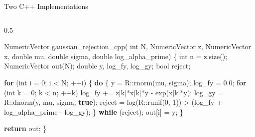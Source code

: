 \documentclass[
  ignorenonframetext,
]{beamer}
\newenvironment{Shaded}{\begin{snugshade}}{\end{snugshade}}
\newcommand{\ControlFlowTok}[1]{\textcolor[rgb]{0.00,0.23,0.31}{\textbf{#1}}}
\newcommand{\DataTypeTok}[1]{\textcolor[rgb]{0.68,0.00,0.00}{#1}}
\newcommand{\DecValTok}[1]{\textcolor[rgb]{0.68,0.00,0.00}{#1}}
\newcommand{\FloatTok}[1]{\textcolor[rgb]{0.68,0.00,0.00}{#1}}
\newcommand{\KeywordTok}[1]{\textcolor[rgb]{0.00,0.23,0.31}{\textbf{#1}}}
\newcommand{\NormalTok}[1]{\textcolor[rgb]{0.00,0.23,0.31}{#1}}
\newcommand{\OperatorTok}[1]{\textcolor[rgb]{0.37,0.37,0.37}{#1}}
\begin{document}
\begin{frame}[fragile]{Two C++ Implementations}
\begin{columns}[T]
\begin{column}{0.5\linewidth}
\begin{Shaded}
\begin{Highlighting}[]
\NormalTok{NumericVector gaussian\_rejection\_cpp}\OperatorTok{(}
    \DataTypeTok{int}\NormalTok{ N}\OperatorTok{,}\NormalTok{ NumericVector z}\OperatorTok{,}
\NormalTok{    NumericVector x}\OperatorTok{,} \DataTypeTok{double}\NormalTok{ mu}\OperatorTok{,}
    \DataTypeTok{double}\NormalTok{ sigma}\OperatorTok{,} \DataTypeTok{double}\NormalTok{ log\_alpha\_prime}\OperatorTok{)} \OperatorTok{\{}
  \DataTypeTok{int}\NormalTok{ n }\OperatorTok{=}\NormalTok{ z}\OperatorTok{.}\NormalTok{size}\OperatorTok{();}
\NormalTok{  NumericVector out}\OperatorTok{(}\NormalTok{N}\OperatorTok{);}
  \DataTypeTok{double}\NormalTok{ y}\OperatorTok{,}\NormalTok{ log\_fy}\OperatorTok{,}\NormalTok{ log\_gy}\OperatorTok{;}
  \DataTypeTok{bool}\NormalTok{ reject}\OperatorTok{;}

  \ControlFlowTok{for} \OperatorTok{(}\DataTypeTok{int}\NormalTok{ i }\OperatorTok{=} \DecValTok{0}\OperatorTok{;}\NormalTok{ i }\OperatorTok{\textless{}}\NormalTok{ N}\OperatorTok{;} \OperatorTok{++}\NormalTok{i}\OperatorTok{)} \OperatorTok{\{}
    \ControlFlowTok{do} \OperatorTok{\{}
\NormalTok{      y }\OperatorTok{=}\NormalTok{ R}\OperatorTok{::}\NormalTok{rnorm}\OperatorTok{(}\NormalTok{mu}\OperatorTok{,}\NormalTok{ sigma}\OperatorTok{);}
\NormalTok{      log\_fy }\OperatorTok{=} \FloatTok{0.0}\OperatorTok{;}
      \ControlFlowTok{for} \OperatorTok{(}\DataTypeTok{int}\NormalTok{ k }\OperatorTok{=} \DecValTok{0}\OperatorTok{;}\NormalTok{ k }\OperatorTok{\textless{}}\NormalTok{ n}\OperatorTok{;} \OperatorTok{++}\NormalTok{k}\OperatorTok{)}
\NormalTok{        log\_fy }\OperatorTok{+=}\NormalTok{ z}\OperatorTok{[}\NormalTok{k}\OperatorTok{]*}\NormalTok{x}\OperatorTok{[}\NormalTok{k}\OperatorTok{]*}\NormalTok{y }\OperatorTok{{-}}\NormalTok{ exp}\OperatorTok{(}\NormalTok{x}\OperatorTok{[}\NormalTok{k}\OperatorTok{]*}\NormalTok{y}\OperatorTok{);}
\NormalTok{      log\_gy }\OperatorTok{=}\NormalTok{ R}\OperatorTok{::}\NormalTok{dnorm}\OperatorTok{(}\NormalTok{y}\OperatorTok{,}\NormalTok{ mu}\OperatorTok{,}\NormalTok{ sigma}\OperatorTok{,} \KeywordTok{true}\OperatorTok{);}
\NormalTok{      reject }\OperatorTok{=}\NormalTok{ log}\OperatorTok{(}\NormalTok{R}\OperatorTok{::}\NormalTok{runif}\OperatorTok{(}\DecValTok{0}\OperatorTok{,} \DecValTok{1}\OperatorTok{))} \OperatorTok{\textgreater{}}
        \OperatorTok{(}\NormalTok{log\_fy }\OperatorTok{+}\NormalTok{ log\_alpha\_prime }\OperatorTok{{-}}\NormalTok{ log\_gy}\OperatorTok{);}
    \OperatorTok{\}} \ControlFlowTok{while} \OperatorTok{(}\NormalTok{reject}\OperatorTok{);}
\NormalTok{    out}\OperatorTok{[}\NormalTok{i}\OperatorTok{]} \OperatorTok{=}\NormalTok{ y}\OperatorTok{;}
  \OperatorTok{\}}

  \ControlFlowTok{return}\NormalTok{ out}\OperatorTok{;}
\OperatorTok{\}}
\end{Highlighting}
\end{Shaded}
\end{column}
\end{columns}

\normalsize
\end{frame}
\end{document}
